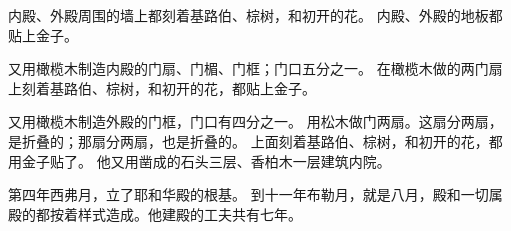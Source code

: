 {\par }{\PP {}内殿、外殿周围的墙上都刻着基路伯、棕树，和初开的花。
内殿、外殿的地板都贴上金子。
\par }{\PP {}又用橄榄木制造内殿的门扇、门楣、门框；门口{}五分之一。
在橄榄木做的两门扇上刻着基路伯、棕树，和初开的花，都贴上金子。
\par }{\PP {}又用橄榄木制造外殿的门框，门口有{}四分之一。
用松木做门两扇。这扇分两扇，是折叠的；那扇分两扇，也是折叠的。
上面刻着基路伯、棕树，和初开的花，都用金子贴了。
他又用凿成的石头三层、香柏木一层建筑内院。
\par }{\PP {}第四年西弗月，立了耶和华殿的根基。
到十一年布勒月，就是八月，殿和一切属殿的都按着样式造成。他建殿的工夫共有七年。

}
